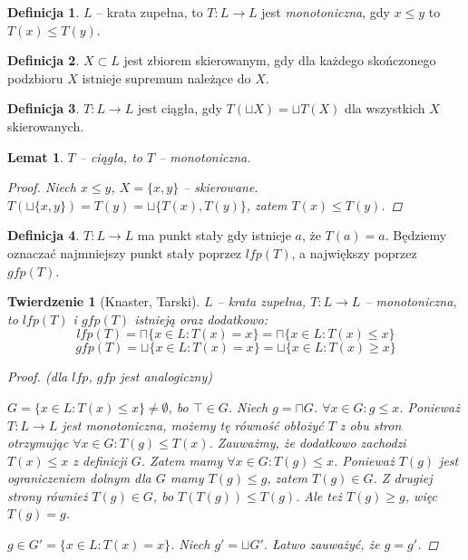 \documentclass[10pt,a4paper]{article}
\theoremstyle{plain}
\newtheorem{theorem}{Twierdzenie}
\newtheorem{lemma}{Lemat}
\theoremstyle{definition}
\newtheorem*{definition}{Definicja}
\begin{document}
\begin{definition}
$L$ -- krata zupełna, to $T : L \to L$ jest \emph{monotoniczna}, gdy $x \leq y$ to $T(x) \leq T(y)$.
\end{definition}

\begin{definition}
$X \subset L$ jest zbiorem skierowanym, gdy dla każdego skończonego podzbioru $X$ istnieje supremum należące do $X$.
\end{definition}

\begin{definition}
$T : L \to L$ jest ciągła, gdy $T(\sqcup X) = \sqcup T(X)$ dla wszystkich $X$ skierowanych.
\end{definition}

\begin{lemma}
$T$ -- ciągła, to $T$ -- monotoniczna.
\begin{proof}
Niech $x \leq y$, $X = \lbrace x, y \rbrace$ -- skierowane.
$T(\sqcup \lbrace x, y \rbrace) = T(y) = \sqcup \lbrace T(x), T(y) \rbrace$, zatem $T(x) \leq T(y)$.
\end{proof}
\end{lemma}

\begin{definition}
$T : L \to L$ ma punkt stały gdy istnieje $a$, że $T(a) = a$. Będziemy oznaczać najmniejszy punkt stały poprzez $lfp(T)$,
 a największy poprzez $gfp(T)$.
\end{definition}

\begin{theorem}[Knaster, Tarski]
$L$ -- krata zupełna, $T : L \to L$ -- monotoniczna, to $lfp(T)$ i $gfp(T)$ istnieją oraz dodatkowo:
\[ lfp(T) = \sqcap \lbrace x \in L : T(x) = x \rbrace = \sqcap \lbrace x \in L : T(x) \leq x \rbrace \]
\[ gfp(T) = \sqcup \lbrace x \in L : T(x) = x \rbrace = \sqcup \lbrace x \in L : T(x) \geq x \rbrace \]

\begin{proof}{(dla $lfp$, $gfp$ jest analogiczny)}

$G = \lbrace x \in L : T(x) \leq x \rbrace \neq \emptyset$, bo $\top \in G$. Niech $g = \sqcap G$.
$\forall x \in G : g \leq x$. Ponieważ $T : L \to L$ jest monotoniczna, możemy
tę równość obłożyć $T$ z obu stron otrzymując
$\forall x \in G : T(g) \leq T(x)$. Zauważmy, że dodatkowo zachodzi $T(x) \leq x$ z definicji $G$. Zatem mamy
$\forall x \in G : T(g) \leq x$. Ponieważ $T(g)$ jest ograniczeniem dolnym dla $G$ mamy $T(g) \leq g$, zatem $T(g) \in G$.
Z drugiej strony również $T(g) \in G$, bo $T(T(g)) \leq T(g)$. Ale też $T(g) \geq g$, więc $T(g) = g$.

$g \in G' = \lbrace x \in L : T(x) = x \rbrace$. Niech $g' = \sqcup G'$. Łatwo zauważyć, że $g = g'$.
\end{proof}
\end{theorem}
\end{document}
